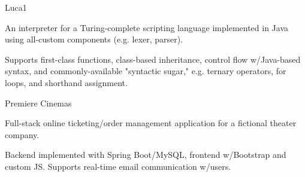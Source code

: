 
\begin{cventries}
  \cventry
    {} %
    {Luca1} %
    {} %
    {} %
    {
      \begin{cvitems} %
        \item {An interpreter for a Turing-complete scripting language implemented in Java using all-custom components (e.g. lexer, parser).}
		\item {Supports first-class functions, class-based inheritance, control flow w/Java-based syntax, and commonly-available "syntactic sugar," e.g. ternary operators, for loops, and shorthand assignment.}
      \end{cvitems}
    }

  \cventry
    {} %
    {Premiere Cinemas} %
    {} %
    {} %
    {
      \begin{cvitems} %
      	\item {Full-stack online ticketing/order management application for a fictional theater company.}
		\item {Backend implemented with Spring Boot/MySQL, frontend w/Bootstrap and custom JS. Supports real-time email communication w/users.}
      \end{cvitems}
    }
\end{cventries}